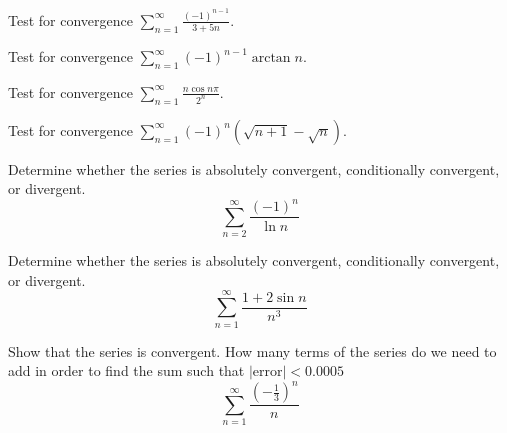 \documentclass[
  course = {{MATH102 Calculus II}},
  quartile = {{2}},
  assignment = {{Sections 11.5}},%
  topic = {{Alternating Series and Absolute Convergence}},
  firstexercise = 1,
  term = 203
]{../class/aga-homework}
\begin{document}

\newpage

\problem Test for convergence $\displaystyle \sum_{n=1}^{\infty}\frac{(-1)^{n-1}}{3+5n}$.

\newpage

\problem Test for convergence $\displaystyle \sum_{n=1}^{\infty}{(-1)^{n-1}\arctan n}$.

\newpage

\problem Test for convergence $\displaystyle \sum_{n=1}^{\infty}\frac{n\cos n\pi}{2^n}$.

\newpage

\problem Test for convergence $\displaystyle \sum_{n=1}^{\infty}{(-1)^{n}(\sqrt{n+1}-\sqrt{n})}$.

\newpage

\problem Determine whether the series is absolutely convergent, conditionally convergent, or divergent.
$$\displaystyle \sum_{n=2}^{\infty}\frac{(-1)^{n}}{\ln n}$$

\newpage

\problem Determine whether the series is absolutely convergent, conditionally convergent, or divergent.
$$\displaystyle \sum_{n=1}^{\infty}\frac{1+2\sin n}{n^3}$$

\newpage

\problem Show that the series is convergent. How many terms of the series do we need to add in order to find the sum such that $|\text{error}|<0.0005$
$$\displaystyle \sum_{n=1}^{\infty}\frac{\left(-\frac{1}{3}\right)^n}{n}$$


\newpage
\afterpage{\null\newpage}

\afterpage{\null\newpage}

\afterpage{\null\newpage}
\end{document}
